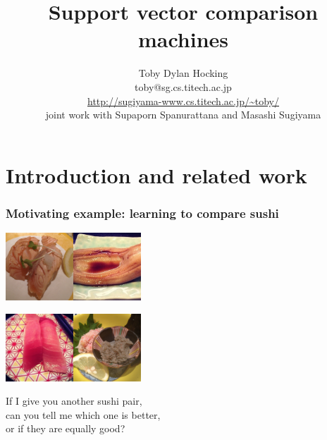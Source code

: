 \documentclass{beamer}
\begin{document}
\title{Support vector comparison machines}
\author{
Toby Dylan Hocking\\
toby@sg.cs.titech.ac.jp\\
\url{http://sugiyama-www.cs.titech.ac.jp/~toby/}\\
joint work with Supaporn Spanurattana and Masashi Sugiyama
}


\maketitle

\section{Introduction and related work}

\begin{frame}
  \frametitle{Motivating example: learning to compare sushi}
  \includegraphics[width=1in]{sushi_salmon}\includegraphics[width=1in]{sushi_anago}

  \includegraphics[width=1in]{sushi_chu-toro}\includegraphics[width=1in]{sushi_kani-miso}

If I give you another sushi pair,\\
can you tell me which one is better,\\
\alert<2>{or if they are equally good?}
\end{frame}
\end{document}
